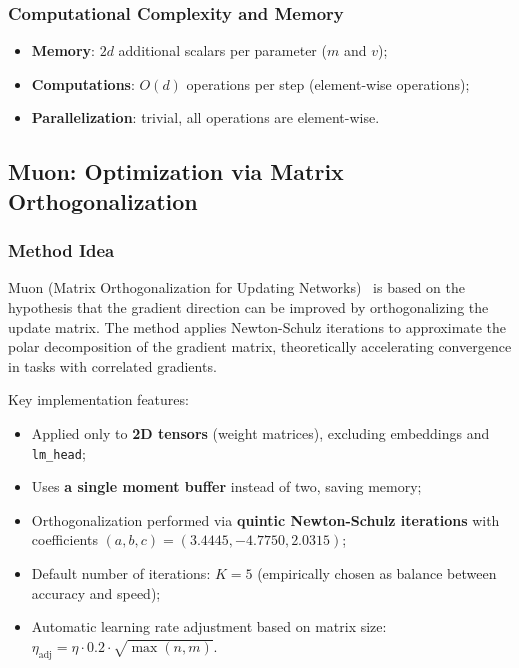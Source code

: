 \documentclass[a4paper,12pt]{article}
\begin{document}
\subsubsection{Computational Complexity and Memory}

\begin{itemize}
    \item \textbf{Memory}: $2d$ additional scalars per parameter ($m$ and $v$);
    \item \textbf{Computations}: $O(d)$ operations per step (element-wise operations);
    \item \textbf{Parallelization}: trivial, all operations are element-wise.
\end{itemize}

\subsection{Muon: Optimization via Matrix Orthogonalization}

\subsubsection{Method Idea}

Muon (Matrix Orthogonalization for Updating Networks)~\cite{moonshot2024muon} is based on the hypothesis that the gradient direction can be improved by orthogonalizing the update matrix. The method applies Newton-Schulz iterations to approximate the polar decomposition of the gradient matrix, theoretically accelerating convergence in tasks with correlated gradients.

Key implementation features:
\begin{itemize}
    \item Applied only to \textbf{2D tensors} (weight matrices), excluding embeddings and \texttt{lm\_head};
    \item Uses \textbf{a single moment buffer} instead of two, saving memory;
    \item Orthogonalization performed via \textbf{quintic Newton-Schulz iterations} with coefficients $(a, b, c) = (3.4445, -4.7750, 2.0315)$;
    \item Default number of iterations: $K = 5$ (empirically chosen as balance between accuracy and speed);
    \item Automatic learning rate adjustment based on matrix size: $\eta_{\text{adj}} = \eta \cdot 0.2 \cdot \sqrt{\max(n, m)}$.
\end{itemize}
\end{document}
